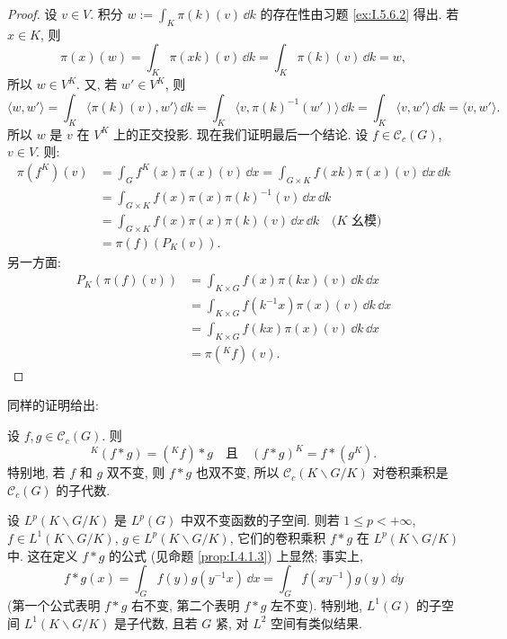 \begin{proof}
设 $v \in V$. 积分 $w := \int_K\pi(k)(v)\,\dd k$ 的存在性由习题 \ref{ex:I.5.6.2} 得出. 若 $x \in K$, 则
\[
\pi(x)(w) = \int_K\pi(xk)(v)\,\dd k = \int_K\pi(k)(v)\,\dd k = w,
\]
所以 $w \in V^K$. 又, 若 $w' \in V^K$, 则
\[
\langle w, w' \rangle = \int_K\langle \pi(k)(v), w' \rangle\,\dd k = \int_K\langle v, \pi(k)^{-1}(w') \rangle\,\dd k = \int_K\langle v, w' \rangle\,\dd k = \langle v, w' \rangle.
\]
所以 $w$ 是 $v$ 在 $V^K$ 上的正交投影.
现在我们证明最后一个结论. 设 $f \in \mathcal{C}_c(G)$, $v \in V$. 则:
\begin{align*}
\pi(f^K)(v) &= \int_G f^K(x)\pi(x)(v)\,\dd x = \int_{G \times K}f(xk)\pi(x)(v)\,\dd x\,\dd k \\
&= \int_{G \times K}f(x)\pi(x)\pi(k)^{-1}(v)\,\dd x\,\dd k \\
&= \int_{G \times K}f(x)\pi(x)\pi(k)(v)\,\dd x\,\dd k \quad \text{($K$ 幺模)} \\
&= \pi(f)(P_K(v)).
\end{align*}
另一方面:
\begin{align*}
P_K(\pi(f)(v)) &= \int_{K \times G}f(x)\pi(kx)(v)\,\dd k\,\dd x \\
&= \int_{K \times G}f(k^{-1}x)\pi(x)(v)\,\dd k\,\dd x \\
&= \int_{K \times G}f(kx)\pi(x)(v)\,\dd k\,\dd x \\
&= \pi({}^Kf)(v).
\end{align*}
\end{proof}

同样的证明给出:

\begin{proposition}[卷积与平均化]
\label{prop:V.1.8}
设 $f, g \in \mathcal{C}_c(G)$. 则
\[
{}^K(f * g) = ({}^Kf) * g \quad \text{且} \quad (f * g)^K = f * (g^K).
\]
特别地, 若 $f$ 和 $g$ 双不变, 则 $f * g$ 也双不变, 所以 $\mathcal{C}_c(K\backslash G/K)$ 对卷积乘积是 $\mathcal{C}_c(G)$ 的子代数.
\end{proposition}

\begin{remark}[$L^p$ 空间的情形]
\label{rem:V.1.9}
设 $L^p(K\backslash G/K)$ 是 $L^p(G)$ 中双不变函数的子空间. 则若 $1 \leq p < +\infty$, $f \in L^1(K\backslash G/K)$, $g \in L^p(K\backslash G/K)$, 它们的卷积乘积 $f * g$ 在 $L^p(K\backslash G/K)$ 中. 这在定义 $f * g$ 的公式 (见命题 \ref{prop:I.4.1.3}) 上显然; 事实上,
\[
f * g(x) = \int_G f(y)g(y^{-1}x)\,\dd x = \int_G f(xy^{-1})g(y)\,\dd y
\]
(第一个公式表明 $f * g$ 右不变, 第二个表明 $f * g$ 左不变).
特别地, $L^1(G)$ 的子空间 $L^1(K\backslash G/K)$ 是子代数, 且若 $G$ 紧, 对 $L^2$ 空间有类似结果.
\end{remark}


